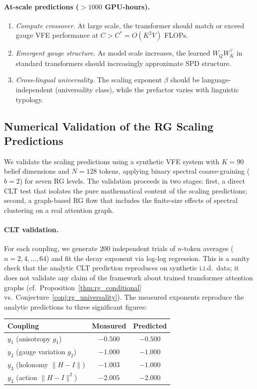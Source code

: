 \documentclass[twoside,11pt]{article}
\begin{document}
\paragraph{At-scale predictions ($>1000$ GPU-hours).}
\begin{enumerate}
\item \emph{Compute crossover.} At large scale, the transformer should match or exceed gauge VFE performance at $C > C^* = O(K^2 V)$ FLOPs.
\item \emph{Emergent gauge structure.} As model scale increases, the learned $W_Q W_K^\top$ in standard transformers should increasingly approximate SPD structure.
\item \emph{Cross-lingual universality.} The scaling exponent $\beta$ should be language-independent (universality class), while the prefactor varies with linguistic typology.
\end{enumerate}

\subsection{Numerical Validation of the RG Scaling Predictions}
\label{sec:rg_numerical_supp}

We validate the scaling predictions using a synthetic VFE system with $K = 90$ belief dimensions and $N = 128$ tokens, applying binary spectral coarse-graining ($b = 2$) for seven RG levels. The validation proceeds in two stages: first, a direct CLT test that isolates the pure mathematical content of the scaling predictions; second, a graph-based RG flow that includes the finite-size effects of spectral clustering on a real attention graph.

\paragraph{CLT validation.}
For each coupling, we generate $200$ independent trials of $n$-token averages ($n = 2, 4, \ldots, 64$) and fit the decay exponent via log-log regression. This is a sanity check that the analytic CLT prediction reproduces on synthetic i.i.d.\ data; it does not validate any claim of the framework about trained transformer attention graphs (cf.\ Proposition~\ref{thm:rg_conditional} vs.\ Conjecture~\ref{conj:rg_universality}). The measured exponents reproduce the analytic predictions to three significant figures:
\begin{center}
\begin{tabular}{lcc}
\toprule
\textbf{Coupling} & \textbf{Measured} & \textbf{Predicted} \\
\midrule
$y_1$ (anisotropy $g_1$) & $-0.500$ & $-0.500$ \\
$y_2$ (gauge variation $g_2$) & $-1.000$ & $-1.000$ \\
$y_3$ (holonomy $\|H - I\|$) & $-1.003$ & $-1.000$ \\
$y_3$ (action $\|H - I\|^2$) & $-2.005$ & $-2.000$ \\
\bottomrule
\end{tabular}
\end{center}
\end{document}
